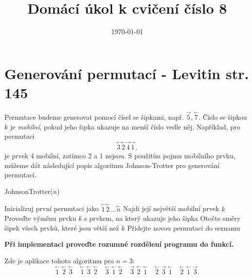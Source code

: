 \documentclass{article}
\title{Domácí úkol k cvičení číslo 8}
\author{}
\date{\today}
\begin{document}
	
\maketitle

\section*{Generování permutací - Levitin str. 145}
Permutace budeme generovat pomocí čísel se šipkami, např. $\overset{\rightarrow}{5}, \overset{\leftarrow}{7} $.
Číslo se šipkou \( k \) je   \textit{mobilní}, pokud jeho šipka ukazuje na menší číslo vedle něj.
Například, pro permutaci
\[ \overset{\leftarrow}{3} \overset{\leftarrow}{2} \overset{\rightarrow}{4} \overset{\rightarrow}{1}, \]
je prvek 4 mobilní, zatímco 2 a 1 nejsou.
S použitím pojmu mobilního prvku, můžeme dát následující popis algoritmu Johnson-Trotter pro generování permutací.

\begin{algorithm}
	\caption{JohnsonTrotter($n$)}
	\begin{algorithmic}[1]
		\State Inicializuj první permutaci jako \( \overset{\leftarrow}{1} \overset{\leftarrow}{2} \ldots \overset{\leftarrow}{n} \)
		\State Najdi její největší mobilní prvek $k$
		\State Proveďte výměnu prvku $k$ s prvkem, na který ukazuje jeho šipka
		\State Otočte směry šipek všech prvků, které jsou větší než $k$
		\State Přidejte novou permutaci do seznamu
		\EndWhile
		\EndProcedure
	\end{algorithmic}
\end{algorithm}

\textbf{Při implementaci proveďte rozumné rozdělení programu do funkcí.}

Zde je aplikace tohoto algoritmu pro \( n = 3 \):
\[
\overset{\leftarrow}{1} \; \overset{\leftarrow}{2} \; \overset{\leftarrow}{3} \quad
\overset{\leftarrow}{1} \; \overset{\leftarrow}{3} \; \overset{\leftarrow}{2} \quad
\overset{\leftarrow}{3} \; \overset{\leftarrow}{1} \; \overset{\leftarrow}{2} \quad
\overset{\rightarrow}{3} \; \overset{\leftarrow}{2} \; \overset{\leftarrow}{1} \quad
\overset{\leftarrow}{2} \; \overset{\rightarrow}{3} \; \overset{\leftarrow}{1} \quad
\overset{\leftarrow}{2} \; \overset{\leftarrow}{1} \; \overset{\rightarrow}{3}.
\]
\end{document}
